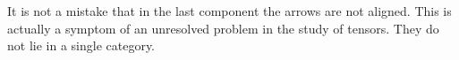 \begin{center}
\end{center}
It is not a mistake that in the last component the arrows are not aligned.
This is actually a symptom of an unresolved problem in the study of tensors.
They do not lie in a single category.  